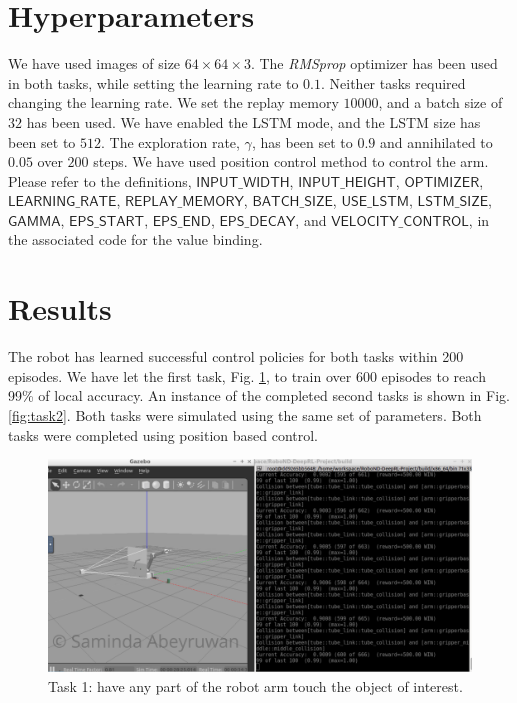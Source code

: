 \documentclass[10pt,journal,compsoc]{IEEEtran}
\begin{document}
\section{Hyperparameters}

We have used images of size $64 \times 64 \times 3$. The \textit{RMSprop} optimizer has been used in both tasks, while setting the learning rate to $0.1$. Neither tasks required changing the learning rate. We set the replay memory $10000$, and a batch size of $32$ has been used. We have enabled the LSTM mode, and the LSTM size has been set to $512$. The exploration rate, $\gamma$, has been set to $0.9$ and annihilated to $0.05$ over $200$ steps. We have used position control method to control the arm. Please refer to the definitions, $\mathsf{INPUT\_WIDTH}$, $\mathsf{INPUT\_HEIGHT}$, $\mathsf{OPTIMIZER}$, $\mathsf{LEARNING\_RATE}$, $\mathsf{REPLAY\_MEMORY}$, $\mathsf{BATCH\_SIZE}$, $\mathsf{USE\_LSTM}$, $\mathsf{LSTM\_SIZE}$,  $\mathsf{GAMMA}$, $\mathsf{EPS\_START}$, $\mathsf{EPS\_END}$, $\mathsf{EPS\_DECAY}$, and $\mathsf{VELOCITY\_CONTROL}$, in the associated code for the value binding.  

\section{Results}

The robot has learned successful control policies for both tasks within 200 episodes. We have let the first task, Fig. \ref{fig:task1}, to train over 600 episodes to reach 99\% of local accuracy. An instance of the completed second tasks is shown in Fig. \ref{fig:task2}. Both tasks were simulated using the same set of parameters.  Both tasks were completed using position based control. 

\begin{figure}[thpb]
      \centering
      \includegraphics[width=\linewidth]{task1}
      \caption{Task 1: have any part of the robot arm touch the object of interest.}
      \label{fig:task1}
\end{figure}
\end{document}
